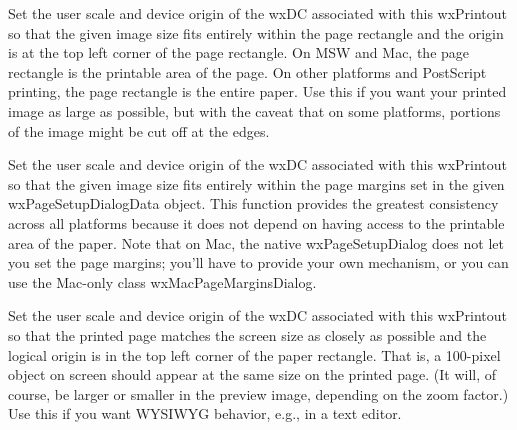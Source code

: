 \label{wxprintoutfitthissizetopage}



Set the user scale and device origin of the wxDC associated with this wxPrintout
so that the given image size fits entirely within the page rectangle and the
origin is at the top left corner of the page rectangle. On MSW and Mac, the page
rectangle is the printable area of the page. On other platforms and PostScript
printing, the page rectangle is the entire paper. Use this if you want your
printed image as large as possible, but with the caveat that on some platforms, 
portions of the image might be cut off at the edges.


\label{wxprintoutfitthissizetopagemargins}


Set the user scale and device origin of the wxDC associated with this wxPrintout
so that the given image size fits entirely within the page margins set in the
given wxPageSetupDialogData object. This function provides the greatest
consistency across all platforms because it does not depend on having access to
the printable area of the paper. Note that on Mac, the native wxPageSetupDialog
does not let you set the page margins; you'll have to provide your own mechanism,
or you can use the Mac-only class wxMacPageMarginsDialog.


\label{wxprintoutmapscreensizetopaper}


Set the user scale and device origin of the wxDC associated with this wxPrintout
so that the printed page matches the screen size as closely as possible
and the logical origin is in the top left corner of the paper rectangle.
That is,
a 100-pixel object on screen should appear at the same size on the printed page. (It
will, of course, be larger or smaller in the preview image, depending on the zoom
factor.) Use this if you want WYSIWYG behavior, e.g., in a text editor.


\label{wxprintoutmapscreensizetopage}


